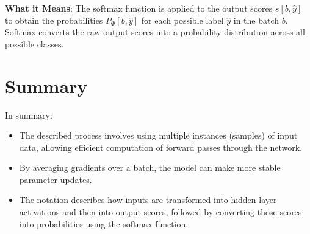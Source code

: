 \documentclass{article}
\begin{document}
\textbf{What it Means}: The softmax function is applied to the output scores \( s[b, \hat{y}] \) to obtain the probabilities \( P_{\Phi}[b, \hat{y}] \) for each possible label \( \hat{y} \) in the batch \( b \). Softmax converts the raw output scores into a probability distribution across all possible classes.

\section{Summary}

In summary:
\begin{itemize}
    \item The described process involves using multiple instances (samples) of input data, allowing efficient computation of forward passes through the network.
    \item By averaging gradients over a batch, the model can make more stable parameter updates.
    \item The notation describes how inputs are transformed into hidden layer activations and then into output scores, followed by converting those scores into probabilities using the softmax function.
\end{itemize}
\end{document}
